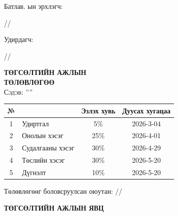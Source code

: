 
\begin{titlepage}

\vspace*{0.5cm}
Батлав. \deptname ын эрхлэгч: 
\begin{flushright}
\makebox[4cm]{\dotfill} /\chairname/ 
\end{flushright}

Удирдагч: 
\begin{flushright}
\makebox[4cm]{\dotfill} /\supname/
\end{flushright}

\begin{center}

\vspace*{2cm}
\textbf{{\large ТӨГСӨЛТИЙН АЖЛЫН \\ ТӨЛӨВЛӨГӨӨ}}\\[0.5cm]

\textsc{\large Сэдэв: ''\ttitle''}\\[0.5cm]

\begin{tabular}{|c|p{7cm}|c|c|}
	\hline
	№ & \makebox[7cm][c]{Ажлын бүлэг, хэсгийн нэр} & Эзлэх хувь & Дуусах хугацаа \\ \hline
	1 & {Удиртгал}         &  5\% & 2026-3-04 \\ \hline
	2 & {Онолын хэсэг}     & 25\% & 2026-4-01 \\ \hline
	3 & {Судалгааны хэсэг} & 30\% & 2026-4-29 \\ \hline
	4 & {Төслийн хэсэг}    & 30\% & 2026-5-20 \\ \hline
	5 & {Дүгнэлт}          & 10\% & 2026-5-20 \\ \hline
\end{tabular}

\vspace{2cm}
Төлөвлөгөөг боловсруулсан оюутан: \makebox[3cm]{\dotfill} /\shortname/

\end{center}

\newpage

\begin{center}

\vspace*{2cm}
\textbf{{\large ТӨГСӨЛТИЙН АЖЛЫН ЯВЦ}}\\[0.5cm]


\end{center}
\end{titlepage}
